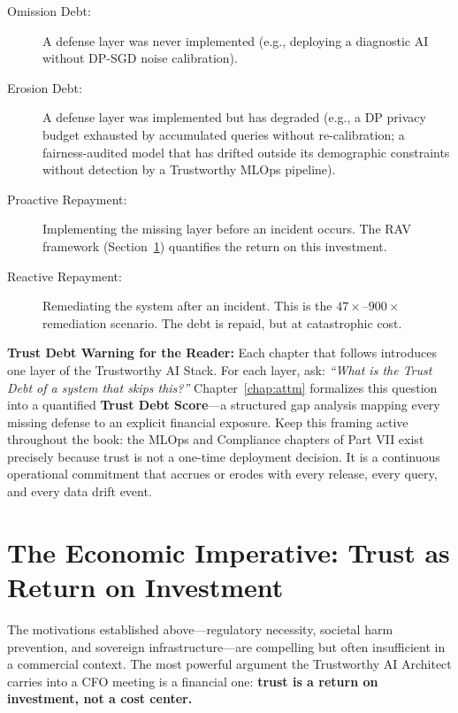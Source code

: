 \begin{description}
  \item[Omission Debt:] A defense layer was never implemented (e.g., deploying a diagnostic AI without DP-SGD noise calibration).
  \item[Erosion Debt:] A defense layer was implemented but has degraded (e.g., a DP privacy budget exhausted by accumulated queries without re-calibration; a fairness-audited model that has drifted outside its demographic constraints without detection by a Trustworthy MLOps pipeline).
  \item[Proactive Repayment:] Implementing the missing layer before an incident occurs. The RAV framework (Section~\ref{sec:economic_imperative}) quantifies the return on this investment.
  \item[Reactive Repayment:] Remediating the system after an incident. This is the $47\times$--$900\times$ remediation scenario. The debt is repaid, but at catastrophic cost.
\end{description}

\begin{svgraybox}
\textbf{Trust Debt Warning for the Reader:} Each chapter that follows introduces one layer of the Trustworthy AI Stack. For each layer, ask: \emph{``What is the Trust Debt of a system that skips this?''} Chapter~\ref{chap:attm} formalizes this question into a quantified \textbf{Trust Debt Score}---a structured gap analysis mapping every missing defense to an explicit financial exposure. Keep this framing active throughout the book: the MLOps and Compliance chapters of Part VII exist precisely because trust is not a one-time deployment decision. It is a continuous operational commitment that accrues or erodes with every release, every query, and every data drift event.
\end{svgraybox}

\section{The Economic Imperative: Trust as Return on Investment}
\label{sec:economic_imperative}

The motivations established above---regulatory necessity, societal harm prevention, and sovereign infrastructure---are compelling but often insufficient in a commercial context. The most powerful argument the Trustworthy AI Architect carries into a CFO meeting is a financial one: \textbf{trust is a return on investment, not a cost center.}

